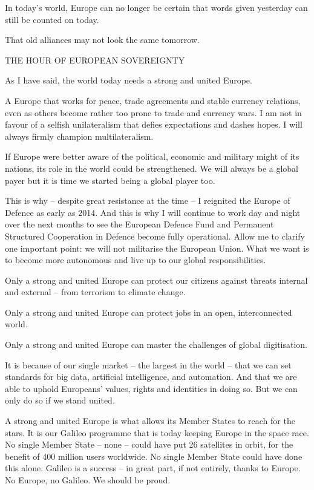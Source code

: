 \documentclass[a4paper,11pt]{article}
\begin{document}
In today's world, Europe can no longer be certain that words given yesterday can still be counted on today.

That old alliances may not look the same tomorrow.

THE HOUR OF EUROPEAN SOVEREIGNTY

As I have said, the world today needs a strong and united Europe.

A Europe that works for peace, trade agreements and stable currency relations, even as others become rather too prone to trade and currency wars. I am not in favour of a selfish unilateralism that defies expectations and dashes hopes. I will always firmly champion multilateralism.

If Europe were better aware of the political, economic and military might of its nations, its role in the world could be strengthened. We will always be a global payer but it is time we started being a global player too.

This is why – despite great resistance at the time – I reignited the Europe of Defence as early as 2014. And this is why I will continue to work day and night over the next months to see the European Defence Fund and Permanent Structured Cooperation in Defence become fully operational. Allow me to clarify one important point: we will not militarise the European Union. What we want is to become more autonomous and live up to our global responsibilities.

Only a strong and united Europe can protect our citizens against threats internal and external – from terrorism to climate change.

Only a strong and united Europe can protect jobs in an open, interconnected world.

Only a strong and united Europe can master the challenges of global digitisation.

It is because of our single market – the largest in the world – that we can set standards for big data, artificial intelligence, and automation. And that we are able to uphold Europeans' values, rights and identities in doing so. But we can only do so if we stand united.

A strong and united Europe is what allows its Member States to reach for the stars. It is our Galileo programme that is today keeping Europe in the space race. No single Member State – none – could have put 26 satellites in orbit, for the benefit of 400 million users worldwide. No single Member State could have done this alone. Galileo is a success – in great part, if not entirely, thanks to Europe. No Europe, no Galileo. We should be proud.
\end{document}
